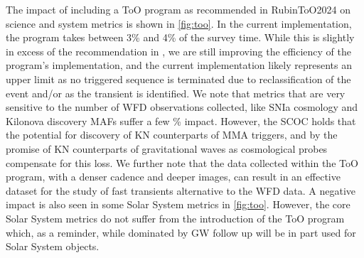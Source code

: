 The impact of including a ToO program as recommended in RubinToO2024 on science and system metrics is shown in \autoref{fig:too}. In the current implementation, the program takes between 3\% and 4\% of the survey time. While this is slightly in excess of the recommendation in , we are still improving the efficiency of the program's implementation, and the current implementation likely represents an upper limit as no triggered sequence is terminated due to reclassification of the event and/or as the transient is identified.
We note that metrics that are very sensitive to the number of WFD observations collected, like SNIa cosmology and Kilonova discovery MAFs suffer a few \% impact. However, the SCOC holds that the potential for discovery of KN counterparts of MMA triggers, and by the promise of KN counterparts of gravitational waves as cosmological probes \citep[\eg ,][]{PhysRevResearch.2.022006, gianfagna2024potential} compensate for this loss. We further note that the data collected within the ToO program, with a denser cadence and deeper images, can result in an effective dataset for the study of fast transients alternative to the WFD data. A negative impact is also seen in some Solar System metrics in \autoref{fig:too}. However, the core Solar System metrics do not suffer from the introduction of the ToO program which, as a reminder, while dominated by GW follow up will be in part used for Solar System objects.

